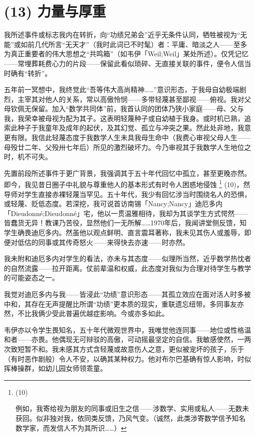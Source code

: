 \section{(13) 力量与厚重}

我所述事件或标志我内在转折，向“功绩兄弟会”近乎无条件认同，牺牲被视为“无能”或如前几代所言“无天才”（我时此词已不时髦）者：平庸、暗淡之人——至多为真正重要者的伟大思想之“共鸣箱”（如韦伊「Weil;Weil」某处所述）。仅凭记忆——常埋葬耗费心力的片段——保留此看似琐碎、无直接关联的事件，便令人信当时确有“转折”。

五年前一冥想中，我终觉此“吾等伟大高尚精神……”意识形态，于我母自幼极端剧烈，主宰其对他人的关系，常以高傲怜悯——多带轻蔑甚至鄙视——俯视。我对父母钦佩无保留。加入“数学共同体”前，我首认同的团体乃狭小家庭——母、父与我，我荣幸被母视为配为其子。这表明轻蔑种子或自幼植于我身。或时机已熟，追索此种子于我童年及成年的起伏，及其幻觉、孤立与冲突之果。然此处非地，我意更有限。我信此轻蔑态度于我数学人生未具我母生命中（我费心审视父母人生——母殁廿二年、父殁卅七年后）所见的激烈破坏力。今乃审视其于我数学人生地位之时，机不可失。

先置前段所述事件于更广背景，我强调其于五十年代回忆中孤立，甚至更晚亦然。即今，我见昔日圈子中礼貌与尊重他人的基本形式有时令人困惑地侵蚀 \footnote{(10)\par 例如，我寄给视为朋友的同事或旧生之信——涉数学、实用或私人——无数未获回。似非独对我，依同类反馈，乃风气变。（诚然，此类涉寄数学信予知名数学家，而发信人不为其所识……）} (10)，然导师对学生直接赤裸轻蔑当罕见。五十年代，我少有回忆涉当时围绕名人的恐惧，或轻蔑、贬低态度。若深挖，我可说首访南锡「Nancy;Nancy」迪厄多内「Dieudonné;Dieudonné」宅，他以一贯温雅相待，我却为其谈学生方式愕然——皆蠢货无异！教课乃苦役，显然他们一无所解……1970年后，我闻讲堂侧反馈，知学生确畏迪厄多内。然虽他以观点鲜明、直言震耳著称，我未见其伤人或羞辱，即便对低估的同事或其传奇怒火——来得快去亦速——时亦然。

我未附和迪厄多内对学生的看法，亦未与其态度——似理所当然，近乎数学热忱者的自然流露——拉开距离。仗前辈温和权威，此态度对我似为合理对待学生与教学的可能姿态之一。

我觉对迪厄多内与我——皆浸此“功绩”意识形态——其孤立效应在面对活人时多被中和，其存在无声提醒比所谓“功绩”更本质的现实，重联遗忘纽带。多同事友亦然，不比我俩少受此普遍优越症影响。今或亦多如此。

韦伊亦以令学生畏知名，五十年代微观世界中，我唯觉他连同事——地位或性格温和者——亦畏。他偶现无可辩驳的高傲，可动摇最坚定的自信。我敏感使然，一两次致短暂不和。我未感其方式含轻蔑或故意伤人之意，更似被宠坏的孩子，乐于（有时恶作剧般）令人不安，以确其某种权力。他对布尔巴基确有惊人影响，时似挥棒操群，如幼儿园女师领乖童。

